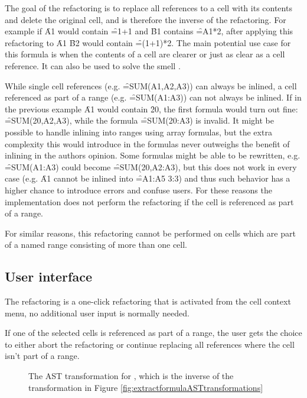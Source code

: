 The goal of the  refactoring is to replace all references to a cell with its contents and delete the original cell, and is therefore the inverse of the  refactoring.
For example if \f{A1} would contain \f{=1+1} and \f{B1} contains \f{=A1*2}, after applying this refactoring to \f{A1} \f{B2} would contain \f{=(1+1)*2}. 
The main potential use case for this formula is when the contents of a cell are clearer or just as clear as a cell reference.
It can also be used to solve the  smell \cite{hermans2014detecting}.

While single cell references (e.g. \f{=SUM(A1,A2,A3)}) can always be inlined, a cell referenced as part of a range (e.g. \f{=SUM(A1:A3)}) can not always be inlined.
If in the previous example \f{A1} would contain \f{20}, the first formula would turn out fine: \f{=SUM(20,A2,A3)}, while the formula \f{=SUM(20:A3)} is invalid.
It might be possible to handle inlining into ranges using array formulas, but the extra complexity this would introduce in the formulas never outweighs the benefit of inlining in the authors opinion.
Some formulas might be able to be rewritten, e.g. \f{=SUM(A1:A3)} could become \f{=SUM(20,A2:A3)}, but this does not work in every case (e.g. \f{A1} cannot be inlined into \f{=A1:A5 3:3}) and thus such behavior has a higher chance to introduce errors and confuse users.
For these reasons the implementation does not perform the refactoring if the cell is referenced as part of a range.

For similar reasons, this refactoring cannot be performed on cells which are part of a named range consisting of more than one cell.

\subsection{User interface}

The refactoring is a one-click refactoring that is activated from the cell context menu, no additional user input is normally needed.

If one of the selected cells is referenced as part of a range, the user gets the choice to either abort the refactoring or continue replacing all references where the cell isn't part of a range.

\begin{figure}
	\centering
	
	\caption{The AST transformation for , which is the inverse of the  transformation in Figure \ref{fig:extractformulaASTtransformations}}
	\label{fig:inlineformulaAST}
\end{figure}

